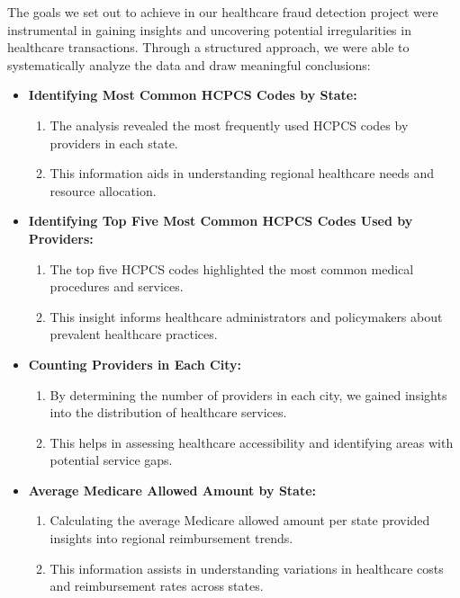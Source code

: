 \documentclass{article}
\begin{document}
\hspace{1cm}The goals we set out to achieve in our healthcare fraud detection project were instrumental in gaining insights and uncovering potential irregularities in healthcare transactions. Through a structured approach, we were able to systematically analyze the data and draw meaningful conclusions:
\begin{itemize}
    \item\textbf{Identifying Most Common HCPCS Codes by State:} 
    \begin{enumerate}
        \item The analysis revealed the most frequently used HCPCS codes by providers in each state.
        \item This information aids in understanding regional healthcare needs and resource allocation.
    \end{enumerate}

    \item\textbf{Identifying Top Five Most Common HCPCS Codes Used by Providers:}
    \begin{enumerate}
        \item The top five HCPCS codes highlighted the most common medical procedures and services.
        \item This insight informs healthcare administrators and policymakers about prevalent healthcare practices.
    \end{enumerate}


    \item\textbf{ Counting Providers in Each City:}
    \begin{enumerate}
        \item By determining the number of providers in each city, we gained insights into the distribution of healthcare services.
        \item This helps in assessing healthcare accessibility and identifying areas with potential service gaps.
    \end{enumerate}

      \item\textbf{Average Medicare Allowed Amount by State:}
      \begin{enumerate}
          \item Calculating the average Medicare allowed amount per state provided insights into regional reimbursement trends.
          \item This information assists in understanding variations in healthcare costs and reimbursement rates across states.
      \end{enumerate}


\end{itemize}
\end{document}

